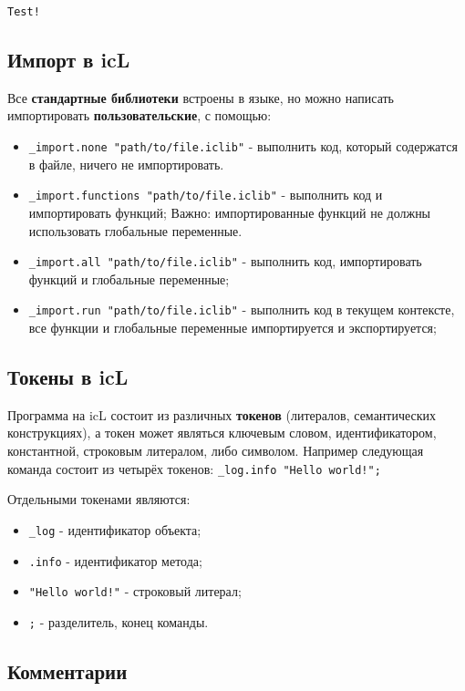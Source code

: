 \documentclass[a4paper, 14pt]{extarticle}
\newenvironment{icItems}
	{ \begin{itemize} [noitemsep,nolistsep] }
	{ \end{itemize} }
\begin{document}
\begin{lstlisting}[numbers=none]
Test!
\end{lstlisting}
	
\subsection{Импорт в icL}
	
	Все \textbf{стандартные библиотеки} встроены в языке, но можно написать импортировать \textbf{пользовательские}, с помощью:
\begin{icItems}
	\item \lstinline`_import.none "path/to/file.iclib"` - выполнить код, который содержатся в файле, ничего не импортировать.
	\item \lstinline`_import.functions "path/to/file.iclib"` - выполнить код и импортировать функций; {\color{red}Важно:} импортированные функций не должны использовать глобальные переменные.
	\item \lstinline`_import.all "path/to/file.iclib"` -  выполнить код, импортировать функций и глобальные переменные;
	\item \lstinline`_import.run "path/to/file.iclib"` - выполнить код в текущем контексте, все функции и глобальные переменные импортируется и экспортируется;
\end{icItems}
	
\subsection{Токены в icL}
	
	Программа на icL состоит из различных \textbf{токенов} (литералов, семантических конструкциях), а токен может являться ключевым словом, идентификатором, константной, строковым литералом, либо символом. Например следующая команда состоит из четырёх токенов: \lstinline`_log.info "Hello world!";`
	
	Отдельными токенами являются:
\begin{icItems}
	\item \lstinline`_log` - идентификатор объекта;
	\item \lstinline`.info` - идентификатор метода;
	\item \lstinline`"Hello world!"` - строковый литерал;
	\item \lstinline`;` - разделитель, конец команды.
\end{icItems}
	
\subsection{Комментарии}
	
\end{document}
